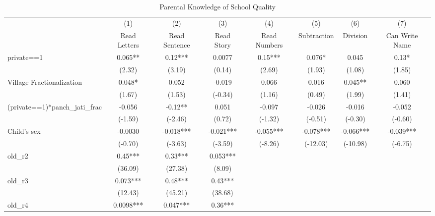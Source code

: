 \begin{table}[htbp]\centering
\def\sym#1{\ifmmode^{#1}\else\(^{#1}\)\fi}
\caption{Parental Knowledge of School Quality\label{knowledge}}
\begin{tabular}{l*{7}{c}}
\toprule
                &\multicolumn{1}{c}{(1)}&\multicolumn{1}{c}{(2)}&\multicolumn{1}{c}{(3)}&\multicolumn{1}{c}{(4)}&\multicolumn{1}{c}{(5)}&\multicolumn{1}{c}{(6)}&\multicolumn{1}{c}{(7)}\\
                &\multicolumn{1}{c}{Read Letters}&\multicolumn{1}{c}{Read Sentence}&\multicolumn{1}{c}{Read Story}&\multicolumn{1}{c}{Read Numbers}&\multicolumn{1}{c}{Subtraction}&\multicolumn{1}{c}{Division}&\multicolumn{1}{c}{Can Write Name}\\
\midrule
private==1      &    0.065** &     0.12***&   0.0077   &     0.15***&    0.076*  &    0.045   &     0.13*  \\
                &   (2.32)   &   (3.19)   &   (0.14)   &   (2.69)   &   (1.93)   &   (1.08)   &   (1.85)   \\
Village Fractionalization&    0.048*  &    0.052   &   -0.019   &    0.066   &    0.016   &    0.045** &    0.060   \\
                &   (1.67)   &   (1.53)   &  (-0.34)   &   (1.16)   &   (0.49)   &   (1.99)   &   (1.41)   \\
(private==1)*panch\_jati\_frac&   -0.056   &    -0.12** &    0.051   &   -0.097   &   -0.026   &   -0.016   &   -0.052   \\
                &  (-1.59)   &  (-2.46)   &   (0.72)   &  (-1.32)   &  (-0.51)   &  (-0.30)   &  (-0.60)   \\
Child's sex     &  -0.0030   &   -0.018***&   -0.021***&   -0.055***&   -0.078***&   -0.066***&   -0.039***\\
                &  (-0.70)   &  (-3.63)   &  (-3.59)   &  (-8.26)   & (-12.03)   & (-10.98)   &  (-6.75)   \\
old\_r2          &     0.45***&     0.33***&    0.053***&            &            &            &            \\
                &  (36.09)   &  (27.38)   &   (8.09)   &            &            &            &            \\
old\_r3          &    0.073***&     0.48***&     0.43***&            &            &            &            \\
                &  (12.43)   &  (45.21)   &  (38.68)   &            &            &            &            \\
old\_r4          &   0.0098***&    0.047***&     0.36***&            &            &            &            \\

\end{tabular}
\end{table}
